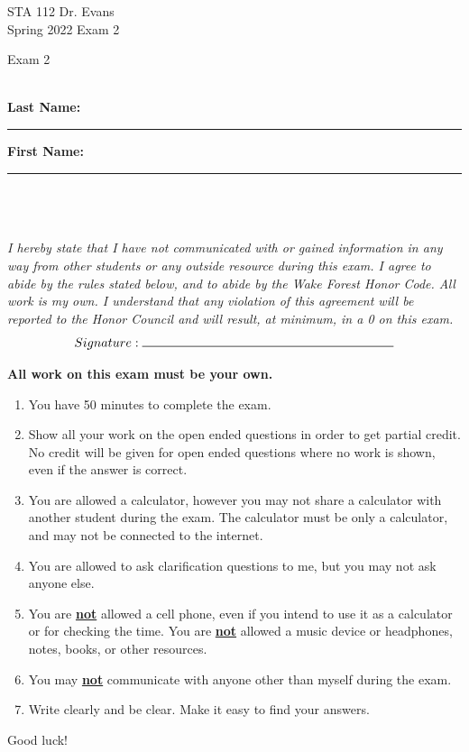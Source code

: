 \documentclass[11pt]{article}
\newcommand{\hl}[1]{\textbf{\underline{#1}}}
\begin{document}
\begin{titlepage}

\enlargethispage{\baselineskip}


STA 112 \hfill Dr. Evans \\
Spring 2022	\hfill Exam 2\\

\vspace{-2cm}

\begin{center}
{\Huge Exam 2}	
\end{center}

$\:$ \\

\textbf{Last Name:} \rule{5cm}{0.5pt}	\hfill	 \textbf{First Name:}  \rule{5cm}{0.5pt}	 \\
$\:$ \\
$\:$ \\

\textit{I hereby state that I have not communicated with or gained information in any way from other students or any outside resource during this exam. I agree to abide by the rules stated below, and to abide by the Wake Forest Honor Code. All work is my own. I understand that any violation of this agreement will be reported to the Honor Council and will result, at minimum, in a 0 on this exam.}
\[ Signature: \rule{7cm}{0.5pt}\]

\hdashrule[0.5ex]{\textwidth}{0.5pt}{3mm}

\textbf{All work on this exam must be your own.}

{\small
\begin{enumerate}
\item You have 50 minutes to complete the exam.
\item Show all your work on the open ended questions in order to get partial credit. No credit will be given for open ended questions where no work is shown, even if the answer is correct.
\item You are allowed a calculator, however you may not share a calculator with another student during the exam. The calculator must be only a calculator, and may not be connected to the internet. 
\item You are allowed to ask clarification questions to me, but you may not ask anyone else. 
\item You are \hl{not} allowed a cell phone, even if you intend to use it as a calculator or for checking the time. You are \hl{not} allowed a music device or headphones, notes, books, or other resources. 
\item You may \hl{not} communicate with anyone other than myself during the exam.
\item Write clearly and be clear. Make it easy to find your answers. 
\end{enumerate}
}
\begin{center}
{\Large Good luck!}
\end{center}
\hdashrule[0.5ex]{\textwidth}{0.5pt}{3mm}


\end{titlepage}
\end{document}
